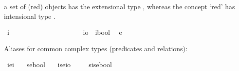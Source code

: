 \begin{isabellebody}
\begin{isamarkuptext}
a set of (red) objects has the extensional type \isa{{\isasymlangle}{\isasymzero}{\isasymrangle}}, whereas the concept `red' has intensional type \isa{{\isasymup}{\isasymlangle}{\isasymzero}{\isasymrangle}}.%
\end{isamarkuptext}\isamarkuptrue%
\isamarkupfalse%
\ i\ \ \ \ \ \ \ \ \ \ \ \ \ \ \ \ \ \ \ \ %
\isanewline
{}\isamarkupfalse%
\ io\ {\isacharequal}\ {\isachardoublequoteopen}{\isacharparenleft}i{\isasymRightarrow}bool{\isacharparenright}{\isachardoublequoteclose}\ %
\isanewline
{}\isamarkupfalse%
\ e\ \ {\isacharparenleft}{\isachardoublequoteopen}{\isasymzero}{\isachardoublequoteclose}{\isacharparenright}\ \ \ \ \ \ \ \ \ \ \ \ \ %
%
\begin{isamarkuptext}%
Aliases for common complex types (predicates and relations):%
\end{isamarkuptext}\isamarkuptrue%
\isamarkupfalse%
\ ie{\isacharequal}{\isachardoublequoteopen}{\isacharparenleft}i{\isasymRightarrow}{\isasymzero}{\isacharparenright}{\isachardoublequoteclose}\ {\isacharparenleft}{\isachardoublequoteopen}{\isasymup}{\isasymzero}{\isachardoublequoteclose}{\isacharparenright}\ %
\isanewline
{}\isamarkupfalse%
\ se{\isacharequal}{\isachardoublequoteopen}{\isacharparenleft}{\isasymzero}{\isasymRightarrow}bool{\isacharparenright}{\isachardoublequoteclose}\ {\isacharparenleft}{\isachardoublequoteopen}{\isasymlangle}{\isasymzero}{\isasymrangle}{\isachardoublequoteclose}{\isacharparenright}\ %
\isanewline
{}\isamarkupfalse%
\ ise{\isacharequal}{\isachardoublequoteopen}{\isacharparenleft}{\isasymzero}{\isasymRightarrow}io{\isacharparenright}{\isachardoublequoteclose}\ {\isacharparenleft}{\isachardoublequoteopen}{\isasymup}{\isasymlangle}{\isasymzero}{\isasymrangle}{\isachardoublequoteclose}{\isacharparenright}\ %
\ \isanewline
{}\isamarkupfalse%
\ sise{\isacharequal}{\isachardoublequoteopen}{\isacharparenleft}{\isasymup}{\isasymlangle}{\isasymzero}{\isasymrangle}{\isasymRightarrow}bool{\isacharparenright}{\isachardoublequoteclose}\ {\isacharparenleft}{\isachardoublequoteopen}{\isasymlangle}{\isasymup}{\isasymlangle}{\isasymzero}{\isasymrangle}{\isasymrangle}{\isachardoublequoteclose}{\isacharparenright}\ %

\end{isabellebody}
